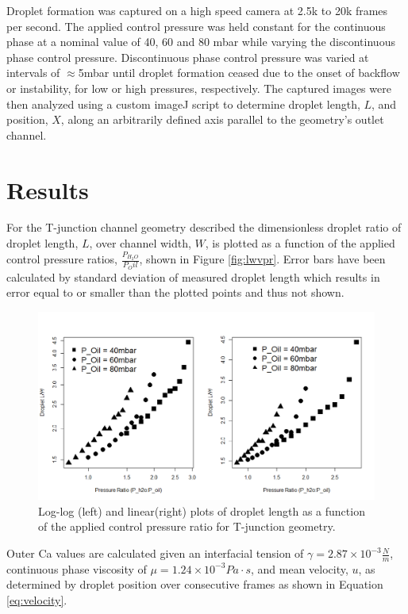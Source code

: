 Droplet formation was captured on a high speed camera at 2.5k to 20k frames per second. The applied control pressure was held constant for the continuous phase at a nominal value of 40, 60 and 80 mbar while varying the discontinuous phase control pressure. Discontinuous phase control pressure was varied at intervals of $\approx$5mbar until droplet formation ceased due to the onset of backflow or instability, for low or high pressures, respectively. The captured images were then analyzed using a custom imageJ script to determine droplet length, $L$, and position, $X$, along an arbitrarily defined axis parallel to the geometry's outlet channel.
 
\section{Results}

For the T-junction channel geometry described the dimensionless droplet ratio of droplet length, $L$, over channel width, $W$, is plotted as a function of the applied control pressure ratios, $\frac{P_{H_2O}}{P_Oil}$, shown in Figure \vref{fig:lwvpr}. Error bars have been calculated by standard deviation of measured droplet length which results in error equal to or smaller than the plotted points and thus not shown.

\begin{figure}
\centering 
\includegraphics[width=01.0\columnwidth]{lwvpr.PNG} 
\caption[Droplet Length as a Function of Applied Control Pressure Ratio]{Log-log (left) and linear(right) plots of droplet length as a function of the applied control pressure ratio for T-junction geometry.} 
\label{fig:lwvpr} 
\end{figure}

Outer Ca values are calculated given an interfacial tension of $\gamma = 2.87 \times 10^{-3}\frac{N}{m}$, continuous phase viscosity of $\mu = 1.24 \times 10^{-3} Pa \cdot s$, \cite{3M2009} and mean velocity, $u$, as determined by droplet position over consecutive frames as shown in Equation \vref{eq:velocity}.

